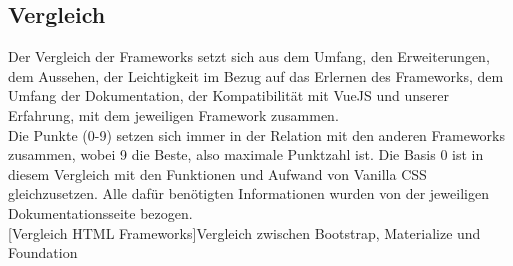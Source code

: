 	\subsection{Vergleich}
	\label{chapter:study-frontend-vergleich}
	Der Vergleich der Frameworks setzt sich aus dem Umfang, den Erweiterungen, dem Aussehen, der Leichtigkeit im Bezug auf das Erlernen des Frameworks, dem Umfang der Dokumentation, der Kompatibilität mit VueJS und unserer Erfahrung, mit dem jeweiligen Framework zusammen.\\
	Die Punkte (0-9) setzen sich immer in der Relation mit den anderen Frameworks zusammen, wobei 9 die Beste, also maximale Punktzahl ist. Die Basis 0 ist in diesem Vergleich mit den Funktionen und Aufwand von Vanilla CSS gleichzusetzen. Alle dafür benötigten Informationen wurden von der jeweiligen Dokumentationsseite bezogen.
	~\\
	[Vergleich HTML Frameworks]{Vergleich zwischen Bootstrap, Materialize und Foundation}\label{tbl:comparison}
